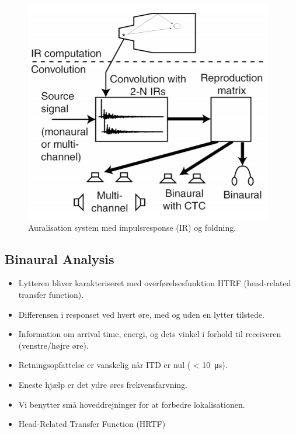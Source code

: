 \begin{figure} [H]
	\centering
	\includegraphics[width=.6\linewidth]{graphics/21.png}
	\caption{Auralisation system med impulsresponse (IR) og foldning.}
	\label{fig:21}
\end{figure}

\subsection{Binaural Analysis}
\begin{itemize}
	\item Lytteren bliver karakteriseret med overførelsesfunktion HTRF (head-related transfer function).
	\item Differensen i responset ved hvert øre, med og uden en lytter tilstede.
	\item Information om arrival time, energi, og dets vinkel i forhold til receiveren (venstre/højre øre).
	\item Retningsopfattelse er vanskelig når ITD er nul ( < \SI{10}{\micro\second}).
	\item Eneste hjælp er det ydre øres	frekvensfarvning.
	\item Vi benytter små hoveddrejninger for at forbedre lokalisationen.
\end{itemize}

\newpage
\begin{itemize}
	\item Head-Related Transfer Function (HRTF)
\end{itemize}


